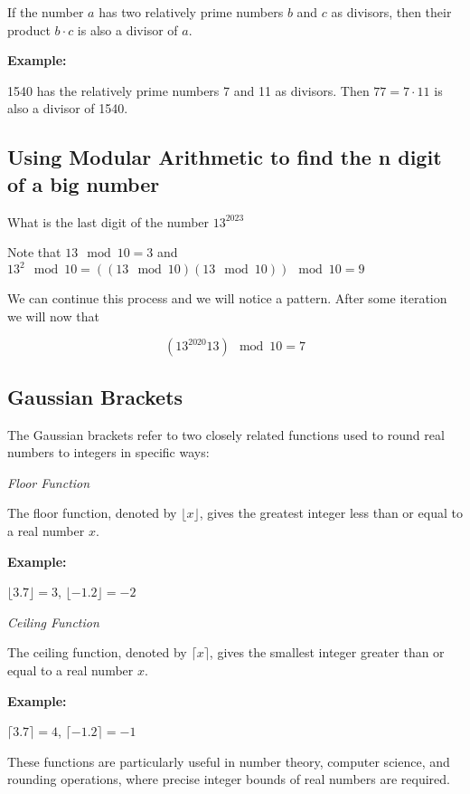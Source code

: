 If the number \( a \) has two relatively prime numbers \( b \) and \( c \) as divisors, then their product \( b \cdot c \) is also a divisor of \( a \). \\
\vspace{\baselineskip}

\textbf{Example:}
\vspace{\baselineskip}


1540 has the relatively prime numbers 7 and 11 as divisors. Then \( 77 = 7 \cdot 11 \) is also a divisor of 1540.

\subsection{Using Modular Arithmetic to find the n digit of a big number}

What is the last digit of the number \(13^{2023}\)

Note that \(13 \mod 10 = 3\) and  \(13^2 \mod 10 =  ((13 \mod 10)  (13\mod 10)) \mod 10 = 9 \)

We can continue this process and we will notice a pattern. After some iteration we will now that

\[(13^{2020} 13) \mod 10 = 7\]

\subsection{Gaussian Brackets}

The Gaussian brackets refer to two closely related functions used to round real numbers to integers in specific ways:

\emph{Floor Function}
\vspace{\baselineskip}

The floor function, denoted by \(\lfloor x \rfloor\), gives the greatest integer less than or equal to a real number \(x\). \\
\vspace{\baselineskip}
    
\textbf{Example:}
\vspace{\baselineskip}
 

\(\lfloor 3.7 \rfloor = 3\), \(\lfloor -1.2 \rfloor = -2\)

\emph{Ceiling Function} 
    
The ceiling function, denoted by \(\lceil x \rceil\), gives the smallest integer greater than or equal to a real number \(x\). \\
\vspace{\baselineskip}

\textbf{Example:}
\vspace{\baselineskip}
 

\(\lceil 3.7 \rceil = 4\), \(\lceil -1.2 \rceil = -1\)
\vspace{\baselineskip}

These functions are particularly useful in number theory, computer science, and rounding operations, where precise integer bounds of real numbers are required.

